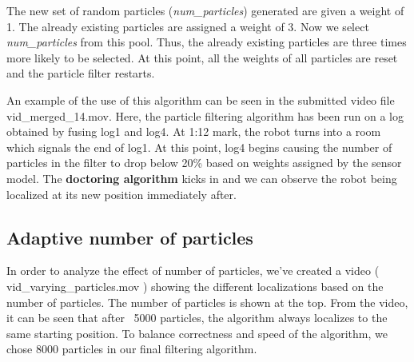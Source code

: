\documentclass{article}
\begin{document}
The new set of random particles (\textit{num\_particles}) generated are given a weight of 1. The already existing particles are assigned a weight of 3. Now we select \textit{num\_particles} from this pool. Thus, the already existing particles are three times more likely to be selected. At this point, all the weights of all particles are reset and the particle filter restarts.

An example of the use of this algorithm can be seen in the submitted video file vid\_merged\_14.mov. Here, the particle filtering algorithm
has been run on a log obtained by fusing log1 and log4. At 1:12 mark, the robot turns into a room which signals the end of log1. At this point, log4 begins causing the number of particles in the filter to drop below 20\% based on weights assigned by the sensor model.
The \textbf{doctoring algorithm} kicks in and we can observe the robot being localized at its new position immediately after.\\


\subsection{Adaptive number of particles}
In order to analyze the effect of number of particles, we've created a video ( vid\_varying\_particles.mov ) showing the different localizations
based on the number of particles. The number of particles is shown at the top. From the video, it can be seen that after ~5000 particles,
the algorithm always localizes to the same starting position. To balance correctness and speed of the algorithm, we chose 8000 particles in
our final filtering algorithm.
\end{document}
